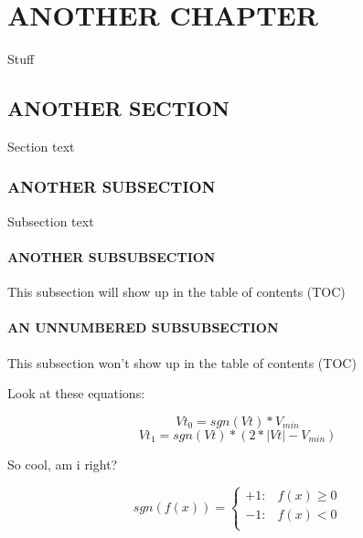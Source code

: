 \documentclass{../Main/main.tex}{subfiles}
\begin{document}
\chapter{ANOTHER CHAPTER}

Stuff

\section{ANOTHER SECTION}
Section text

\subsection{ANOTHER SUBSECTION}

Subsection text

\subsubsection{ANOTHER SUBSUBSECTION}

This subsection will show up in the table of contents (TOC)

\subsubsection*{AN UNNUMBERED SUBSUBSECTION}

This subsection won't show up in the table of contents (TOC)

Look at these equations:

\begin{equation}
    Vt_{0} = sgn(Vt) * V_{min}
\end{equation}
\begin{equation}
    Vt_{1} = sgn(Vt) * (2*|Vt|-V_{min})
\end{equation}

So cool, am i right?

\begin{equation}
    sgn(f(x)) =
    \begin{cases}
        +1: & f(x) \geq 0\\
        -1: & f(x) < 0\\
    \end{cases}
\end{equation}
\end{document}
